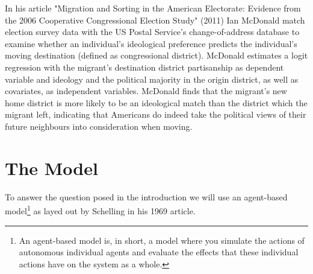 \documentclass[12pt, a4paper]{article}
\begin{document}
\newline In his article "Migration and Sorting in the American Electorate: Evidence from the 2006 Cooperative Congressional Election Study" (2011) Ian McDonald match election survey data with the US Postal Service's change-of-address database to examine whether an individual's ideological preference predicts the individual's moving destination (defined as congressional district). McDonald estimates a logit regression with the migrant's destination district partisanship as dependent variable and ideology and the political majority in the origin district, as well as covariates, as independent variables. McDonald finds that the migrant's new home district is more likely to be an ideological match than the district which the migrant left, indicating that Americans do indeed take the political views of their future neighbours into consideration when moving. 

\section{\label{model}The Model}
To answer the question posed in the introduction we will use an agent-based model\footnote{An agent-based model is, in short, a model where you simulate the actions of autonomous individual agents and evaluate the effects that these individual actions have on the system as a whole.} as layed out by Schelling in his 1969 article. 
\end{document}
